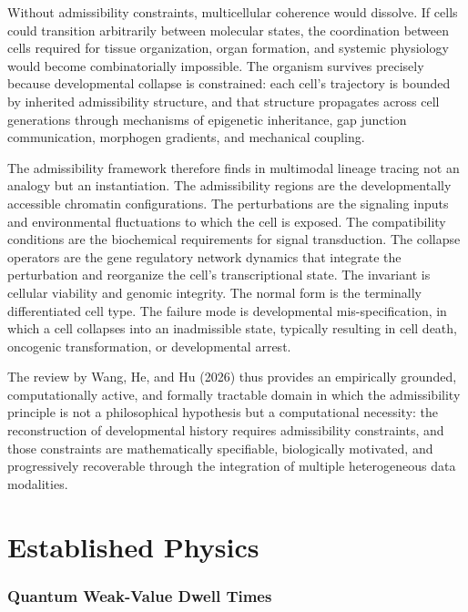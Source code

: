 \documentclass[12pt, a4paper]{article}
\theoremstyle{plain}
\theoremstyle{definition}
\theoremstyle{remark}
\begin{document}
Without admissibility constraints, multicellular coherence would dissolve.
If cells could transition arbitrarily between molecular states, the
coordination between cells required for tissue organization, organ
formation, and systemic physiology would become combinatorially impossible.
The organism survives precisely because developmental collapse is
constrained: each cell's trajectory is bounded by inherited admissibility
structure, and that structure propagates across cell generations through
mechanisms of epigenetic inheritance, gap junction communication,
morphogen gradients, and mechanical coupling.

The admissibility framework therefore finds in multimodal lineage tracing
not an analogy but an instantiation.
The admissibility regions are the developmentally accessible chromatin
configurations.
The perturbations are the signaling inputs and environmental fluctuations
to which the cell is exposed.
The compatibility conditions are the biochemical requirements for signal
transduction.
The collapse operators are the gene regulatory network dynamics that
integrate the perturbation and reorganize the cell's transcriptional state.
The invariant is cellular viability and genomic integrity.
The normal form is the terminally differentiated cell type.
The failure mode is developmental mis-specification, in which a cell
collapses into an inadmissible state, typically resulting in cell death,
oncogenic transformation, or developmental arrest.

The review by Wang, He, and Hu (2026) thus provides an empirically grounded,
computationally active, and formally tractable domain in which the
admissibility principle is not a philosophical hypothesis but a
computational necessity: the reconstruction of developmental history
requires admissibility constraints, and those constraints are
mathematically specifiable, biologically motivated, and progressively
recoverable through the integration of multiple heterogeneous data
modalities.

\part{Established Physics}

\section{Quantum Weak-Value Dwell Times}
\label{sec:quantum}
\end{document}
